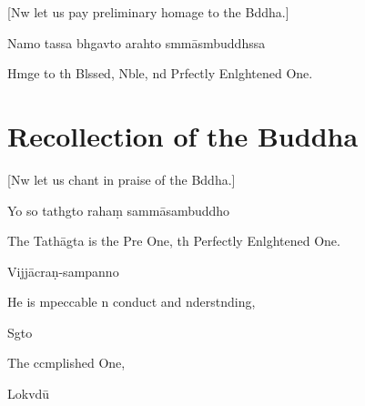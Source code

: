 \begin{leader}
\end{leader}

\begin{english}
  [Nw let us pay preliminary homage to the Bddha.]
\end{english}

Namo tassa bhgavto arahto smmāsmbuddhssa


\begin{english}
  Hmge to th Blssed, Nble, nd Prfectly Enlghtened One.

\end{english}

\chapter{Recollection of the Buddha}


\begin{leader}
\end{leader}

\begin{english}
  [Nw let us chant in praise of the Bddha.]
\end{english}

Yo so tathgto rahaṃ sammāsambuddho

\begin{english}
  The Tathāgta is the Pre One, th Perfectly Enlghtened One.
\end{english}

Vijjācraṇ-sampanno

\begin{english}
  He is mpeccable n conduct and nderstnding,
\end{english}

Sgto

\begin{english}
  The ccmplished One,
\end{english}

Lokvdū


